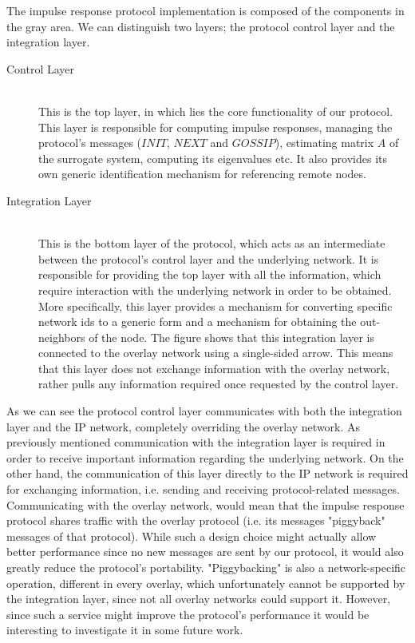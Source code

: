\documentclass[a4paper,11pt,twoside]{report}
\begin{document}
 
The impulse response protocol implementation is composed of the components in the gray area. We can distinguish two layers; the protocol control layer and the integration layer.


\begin{description}
\item[Control Layer] \hfill \\
 This is the top layer, in which lies the core functionality of our protocol. This layer is responsible for computing impulse responses, managing the protocol's messages ($INIT$, $NEXT$ and $GOSSIP$), estimating matrix $A$ of the surrogate system, computing its eigenvalues etc. It also provides its own generic identification mechanism for referencing remote nodes.

\item[Integration Layer] \hfill \\
 This is the bottom layer of the protocol, which acts as an intermediate between the protocol's control layer and the underlying network. It is responsible for providing the top layer with all the information, which require interaction with the underlying network in order to be obtained. More specifically, this layer provides a mechanism for converting specific network ids to a generic form and a mechanism for obtaining the out-neighbors of the node. The figure shows that this integration layer is connected to the overlay network using a single-sided arrow. This means that this layer does not exchange information with the overlay network, rather pulls any information required once requested by the control layer.
\end{description}

As we can see the protocol control layer communicates with both the integration layer and the IP network, completely overriding the overlay network. As previously mentioned communication with the integration layer is required in order to receive important information regarding the underlying network. On the other hand, the communication of this layer directly to the IP network is required for exchanging information, i.e. sending and receiving protocol-related messages. Communicating with the overlay network, would mean that the impulse response protocol shares traffic with the overlay protocol (i.e. its messages "piggyback" messages of that protocol). While such a design choice might actually allow better performance since no new messages are sent by our protocol, it would also greatly reduce the protocol's portability. "Piggybacking" is also a network-specific operation, different in every overlay, which unfortunately cannot be supported by the integration layer, since not all overlay networks could support it. However, since such a service might improve the protocol's performance it would be interesting to investigate it in some future work.\\
\end{document}

